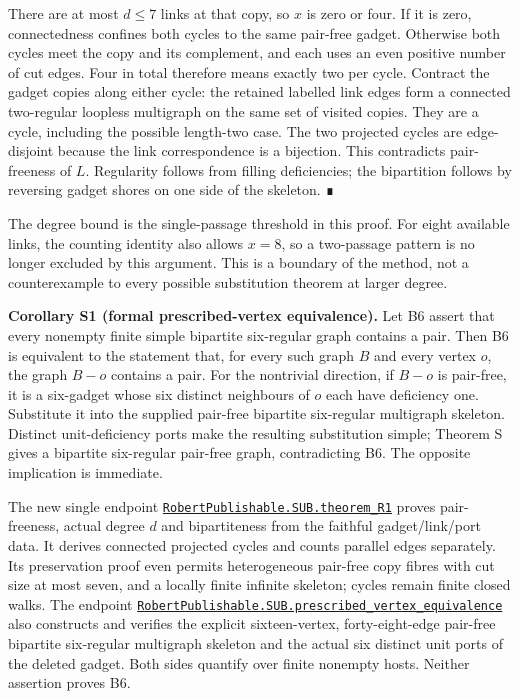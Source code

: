 \documentclass[smallextended]{svjour3}
\newcounter{none} %
\begin{document}
There are at most \(d\leq7\) links at that copy, so \(x\) is zero or
four. If it is zero, connectedness confines both cycles to the same
pair-free gadget. Otherwise both cycles meet the copy and its
complement, and each uses an even positive number of cut edges. Four in
total therefore means exactly two per cycle. Contract the gadget copies
along either cycle: the retained labelled link edges form a connected
two-regular loopless multigraph on the same set of visited copies. They
are a cycle, including the possible length-two case. The two projected
cycles are edge-disjoint because the link correspondence is a bijection.
This contradicts pair-freeness of \(L\). Regularity follows from filling
deficiencies; the bipartition follows by reversing gadget shores on one
side of the skeleton. ∎

The degree bound is the single-passage threshold in this proof. For
eight available links, the counting identity also allows \(x=8\), so a
two-passage pattern is no longer excluded by this argument. This is a
boundary of the method, not a counterexample to every possible
substitution theorem at larger degree.

\textbf{Corollary S1 (formal prescribed-vertex equivalence).} Let B6
assert that every nonempty finite simple bipartite six-regular graph
contains a pair. Then B6 is equivalent to the statement that, for every
such graph \(B\) and every vertex \(o\), the graph \(B-o\) contains a
pair. For the nontrivial direction, if \(B-o\) is pair-free, it is a
six-gadget whose six distinct neighbours of \(o\) each have deficiency
one. Substitute it into the supplied pair-free bipartite six-regular
multigraph skeleton. Distinct unit-deficiency ports make the resulting
substitution simple; Theorem S gives a bipartite six-regular pair-free
graph, contradicting B6. The opposite implication is immediate.

The new single endpoint
\href{https://github.com/alejandrozu/openmath-2026-judging/blob/70c5ec3107658182f22c207d4c50f53f9cb3e602/robert-review-2026-10-07/lean/R1.lean\#L13}{\texttt{RobertPublishable.SUB.theorem\_R1}}
proves pair-freeness, actual degree \(d\) and bipartiteness from the
faithful gadget/link/port data. It derives connected projected cycles
and counts parallel edges separately. Its preservation proof even
permits heterogeneous pair-free copy fibres with cut size at most seven,
and a locally finite infinite skeleton; cycles remain finite closed
walks. The endpoint
\href{https://github.com/alejandrozu/openmath-2026-judging/blob/70c5ec3107658182f22c207d4c50f53f9cb3e602/robert-review-2026-10-07/lean/PrescribedVertex.lean\#L89}{\texttt{RobertPublishable.SUB.prescribed\_vertex\_equivalence}}
also constructs and verifies the explicit sixteen-vertex,
forty-eight-edge pair-free bipartite six-regular multigraph skeleton and
the actual six distinct unit ports of the deleted gadget. Both sides
quantify over finite nonempty hosts. Neither assertion proves B6.
\end{document}
